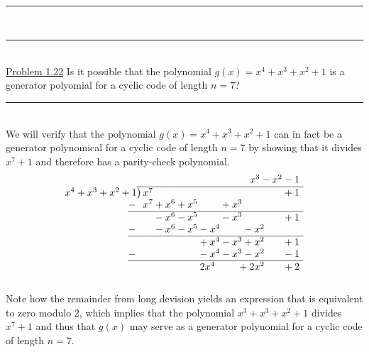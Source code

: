 \documentclass{article}
\newcommand*{\mathcolor}{}
\def\mathcolor#1#{\mathcoloraux{#1}}
\newcommand*{\mathcoloraux}[3]{%
  \protect\leavevmode
  \begingroup
    \color#1{#2}#3%
  \endgroup
 }
\newcommand{\mathspace}[1]{\mathcolor{white}{#1}}
\newcommand{\problemsep}{\leavevmode\\[0.05in] \rule[\baselineskip/4]{\textwidth}{1pt} \\[0.005in] \rule[\baselineskip]{\textwidth}{1pt}\vspace{-\baselineskip}\leavevmode\\[0.05in]}
\newcommand{\statementsep}{\leavevmode\\[0.005in] \rule[\baselineskip/4]{\textwidth}{0.4pt}\leavevmode\\[0.005in]}
\begin{document}
\problemsep
\noindent\underline{Problem 1.22}
Is it possible that the polynomial $g(x) = x^4 + x^3 + x^2 + 1$ is a generator polyomial for a cyclic code of length $n = 7$?
\statementsep
We will verify that the polynomial $g(x) = x^4 + x^3 + x^2 + 1$ can in fact be a generator polynomical for a cyclic code of length $n = 7$ by showing that it divides $x^7 + 1$ and therefore has a parity-check polynomial.
\begin{equation*}
\begin{array}{r}
x^3 - x^2 - 1\phantom{)}   \\
x^4 + x^3 + x^2 + 1{\overline{\smash{\big)}\,            x^7 \mathspace{+ x^6} \mathspace{+ x^5} \mathspace{+ x^4} \mathspace{+ x^3} \mathspace{+ x^2} \mathspace{+ x}            + 1  \phantom{)} }}\\
\underline{-~\phantom{(}                                 x^7            + x^6             + x^5  \mathspace{+ x^4}            + x^3  \mathspace{+ x^2} \mathspace{+ x} \mathspace{+ 1} \phantom{)} } \\
           \phantom{-~(}                      \mathspace{x^7}           - x^6             - x^5  \mathspace{+ x^4}            - x^3  \mathspace{+ x^2} \mathspace{+ x}            + 1  \phantom{)}   \\ 
\underline{-~\phantom{(}                      \mathspace{x^7}           - x^6             - x^5             - x^4  \mathspace{+ x^3}            - x^2  \mathspace{+ x} \mathspace{+ 1} \phantom{)} } \\ 
					 \phantom{-~(}                      \mathspace{x^7}\mathspace{+ x^6} \mathspace{+ x^5}            + x^4             - x^3             + x^2  \mathspace{+ x}            + 1  \phantom{)}   \\
\underline{-~\phantom{(}                      \mathspace{x^7}\mathspace{+ x^6} \mathspace{+ x^5}            - x^4             - x^3             - x^2  \mathspace{+ x}            - 1  \phantom{)} } \\
           \phantom{-~(}                      \mathspace{x^7}\mathspace{+ x^6} \mathspace{+ x^5}             2x^4  \mathspace{+ x^3}            + 2x^2 \mathspace{+ x}            + 2  \phantom{)}   \\ 
\phantom{)} 
\end{array}	
\end{equation*}
Note how the remainder from long devision yields an expression that is equivalent to zero modulo 2, which implies that the polynomial $x^3 + x^3 + x^2 + 1$ divides $x^7 + 1$ and thus that $g(x)$ may serve as a generator polynomial for a cyclic code of length $n = 7$.
\end{document}
